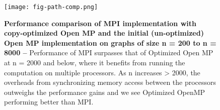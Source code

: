 
\begin{figure}[h]

  \centering
  \texttt{[image: fig-path-comp.png]}

  \caption{\textbf{Performance comparison of MPI implementation with copy-optimized Open MP and the initial (un-optimized) Open MP implementation on graphs of size n = 200 to n = 8000 --} Performance of MPI surpasses that of Optimized Open MP at n = 2000 and below, where it benefits from running the computation on multiple processors. As n increases > 2000, the overheads from synchronizing memory access between the processors outweighs the performance gains and we see Optimized OpenMP performing better than MPI.}

  \label{fig-path-runtime}

\end{figure}
 